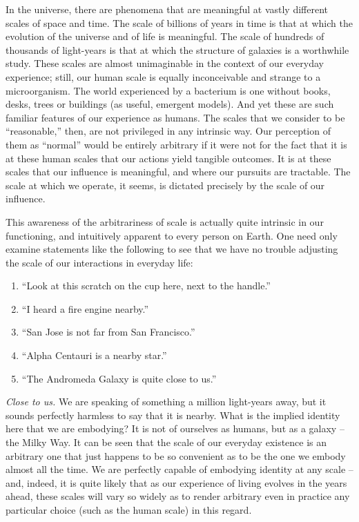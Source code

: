 \documentclass[pra,twocolumn,groupedaddress,10pt]{revtex4}
\theoremstyle{definition}
\begin{document}
In the universe, there are phenomena that are meaningful at vastly different scales of space and time. The scale of billions of years in time is that at which the evolution of the universe and of life is meaningful. The scale of hundreds of thousands of light-years is that at which the structure of galaxies is a worthwhile study. These scales are almost unimaginable in the context of our everyday experience; still, our human scale is equally inconceivable and strange to a microorganism. The world experienced by a bacterium is one without books, desks, trees or buildings (as useful, emergent models). And yet these are such familiar features of our experience as humans. The scales that we consider to be ``reasonable,'' then, are not privileged in any intrinsic way. Our perception of them as ``normal'' would be entirely arbitrary if it were not for the fact that it is at these human scales that our actions yield tangible outcomes. It is at these scales that our influence is meaningful, and where our pursuits are tractable. The scale at which we operate, it seems, is dictated precisely by the scale of our influence.

This awareness of the arbitrariness of scale is actually quite intrinsic in our functioning, and intuitively apparent to every person on Earth. One need only examine statements like the following to see that we have no trouble adjusting the scale of our interactions in everyday life:

\begin{enumerate}
	\item ``Look at this scratch on the cup here, next to the handle.''
	\item ``I heard a fire engine nearby.''
	\item ``San Jose is not far from San Francisco.''
	\item ``Alpha Centauri is a nearby star.''
	\item ``The Andromeda Galaxy is quite close to us.''
\end{enumerate}

\textit{Close to us.} We are speaking of something a million light-years away, but it sounds perfectly harmless to say that it is nearby. What is the implied identity here that we are embodying? It is not of ourselves as humans, but as a galaxy -- the Milky Way. It can be seen that the scale of our everyday existence is an arbitrary one that just happens to be so convenient as to be the one we embody almost all the time. We are perfectly capable of embodying identity at any scale -- and, indeed, it is quite likely that as our experience of living evolves in the years ahead, these scales will vary so widely as to render arbitrary even in practice any particular choice (such as the human scale) in this regard.
\end{document}
